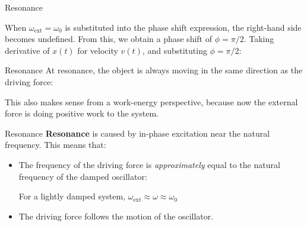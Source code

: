 \documentclass[12pt,compress,aspectratio=169]{beamer}
\begin{document}
\begin{frame}{Resonance}

  When $\omega_\text{ext}=\omega_0$ is substituted into the phase shift
  expression, the right-hand side becomes undefined. From this, we obtain a
  phase shift of $\phi=\pi/2$. Taking derivative of $x(t)$ for velocity $v(t)$,
  and substituting $\phi=\pi/2$:
  
\end{frame}



\begin{frame}{Resonance}
  At resonance, the object is always moving in the same direction as the
  driving force:


  This also makes sense from a work-energy perspective, because now the
  external force is doing positive work to the system.
\end{frame}



\begin{frame}{Resonance}
  \textbf{Resonance} is caused by in-phase excitation near the natural
  frequency. This means that:
  \begin{itemize}
  \item The frequency of the driving force is \emph{approximately} equal to the
    natural frequency of the damped oscillator:


    For a lightly damped system, $\omega_\text{ext}\approx\omega\approx\omega_0$
  \item The driving force follows the motion of the oscillator.
  \end{itemize}
\end{frame}
\end{document}
